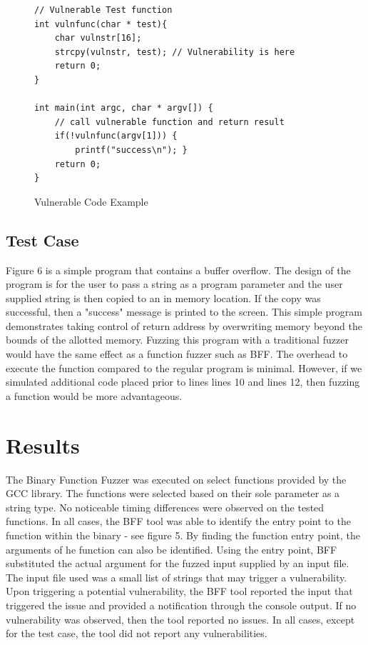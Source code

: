 \documentclass[conference]{IEEEtran}
\begin{document}
\begin{figure}
\begin{lstlisting}
// Vulnerable Test function
int vulnfunc(char * test){
	char vulnstr[16];
	strcpy(vulnstr, test); // Vulnerability is here
	return 0;
}

int main(int argc, char * argv[]) {
	// call vulnerable function and return result
	if(!vulnfunc(argv[1])) {
	    printf("success\n"); }
	return 0;
}
\end{lstlisting}
\caption{Vulnerable Code Example}
\end{figure}

\subsection{Test Case}
Figure 6 is a simple program that contains a buffer overflow. The design of the program is for the user to pass a string as a program parameter and the user supplied string is then copied to an in memory location. If the copy was successful, then a "success" message is printed to the screen. This simple program demonstrates taking control of return address by overwriting memory beyond the bounds of the allotted memory. Fuzzing this program with a traditional fuzzer would have the same effect as a function fuzzer such as BFF. The overhead to execute the function compared to the regular program is minimal. However, if we simulated additional code placed prior to lines lines 10 and lines 12, then fuzzing a function would be more advantageous.  

\section{Results}
The Binary Function Fuzzer was executed on select functions provided by the GCC library. The functions were selected based on their sole parameter as a string type. No noticeable timing differences were observed on the tested functions. In all cases, the BFF tool was able to identify the entry point to the function within the binary - see figure 5. By finding the function entry point, the arguments of he function can also be identified.  Using the entry point, BFF substituted the actual argument for the fuzzed input supplied by an input file. The input file used was a small list of strings that may trigger a vulnerability. Upon triggering a potential vulnerability, the BFF tool reported the input that triggered the issue and provided a notification through the console output. If no vulnerability was observed, then the tool reported no issues. In all cases, except for the test case, the tool did not report any vulnerabilities.
\end{document}
